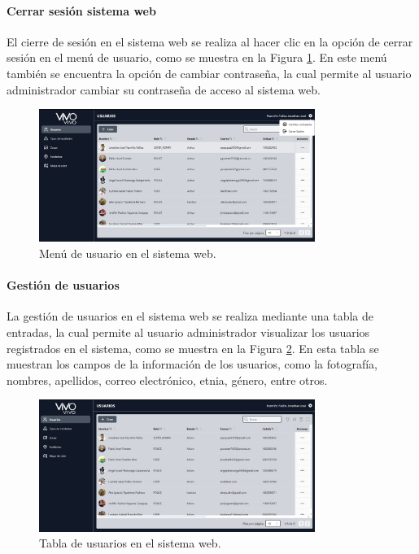 
\paragraph{Cerrar sesión sistema web}
El cierre de sesión en el sistema web se realiza al hacer clic en la opción de cerrar sesión en el menú de usuario, como se muestra
en la Figura \ref{fig:menu-usuario-web}. En este menú también se encuentra la opción de cambiar contraseña, la cual permite al usuario
administrador cambiar su contraseña de acceso al sistema web.

\begin{figure}[H]
    \centering
    \includegraphics[width=0.8\textwidth]{chapters/III-resultados-y-discusion/resources/images/menu-usuario-web.png}
    \caption{Menú de usuario en el sistema web.}
    \label{fig:menu-usuario-web}
\end{figure}

\paragraph{Gestión de usuarios}
La gestión de usuarios en el sistema web se realiza mediante una tabla de entradas, la cual permite al usuario administrador
visualizar los usuarios registrados en el sistema, como se muestra en la Figura \ref{fig:tabla-usuarios-web}. En esta tabla se
muestran los campos de la información de los usuarios, como la fotografía, nombres, apellidos, correo electrónico, etnia, género,
entre otros.

\begin{figure}[H]
    \centering
    \includegraphics[width=0.8\textwidth]{chapters/III-resultados-y-discusion/resources/images/tabla-usuarios-web.png}
    \caption{Tabla de usuarios en el sistema web.}
    \label{fig:tabla-usuarios-web}
\end{figure}


